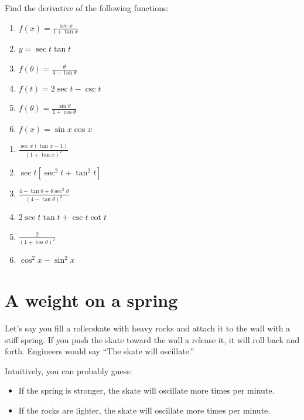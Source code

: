 \begin{Exercise}[title = Derivatives of Trig Functions 2, label=trigderiv2]
    Find the derivative of the following functions:
    \begin{enumerate}
        \item $f(x) = \frac{\sec{x}}{1+\tan{x}}$
        \item $y=\sec{t}\tan{t}$
        \item $f(\theta) = \frac{\theta}{4-\tan{\theta}}$
        \item $f(t) = 2\sec{t} - \csc{t}$
        \item $f(\theta) = \frac{\sin{\theta}}{1+\cos{\theta}}$
        \item $f(x) = \sin{x}\cos{x}$
    \end{enumerate}
\end{Exercise}

\begin{Answer}
    [ref=trigderiv2]
    \begin{enumerate}
        \item $\frac{\sec{x}(\tan{x}-1)}{(1+\tan{x})^2}$
        \item $\sec{t}[\sec^2{t}+\tan^2{t}]$
        \item $\frac{4-\tan{\theta}+\theta \sec^2{\theta}}{(4-\tan{\theta})^2}$
        \item $2\sec{t}\tan{t}+\csc{t}\cot{t}$
        \item $\frac{2}{(1+\cos{\theta})^2}$
        \item $\cos^2{x} - \sin^2{x}$
    \end{enumerate}
\end{Answer}


\section{A weight on a spring}

Let's say you fill a rollerskate with heavy rocks and attach it to the
wall with a stiff spring.  If you push the skate toward the wall a
release it, it will roll back and forth. Engineers would say ``The skate will oscillate.''

Intuitively, you can probably guess:
\begin{itemize}
\item If the spring is stronger, the skate will oscillate more times per minute.
\item If the rocks are lighter, the skate will oscillate more times per minute.
\end{itemize}

